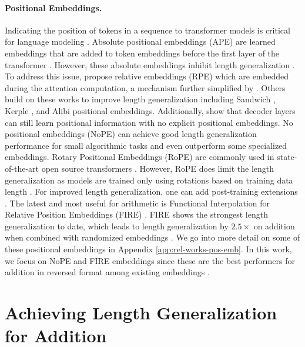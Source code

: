 \documentclass{article}
\begin{document}
\paragraph{Positional Embeddings.}
Indicating the position of tokens in a sequence to transformer models is critical for language modeling \citep{vaswani2017attention}.
Absolute positional embeddings (APE) are learned embeddings that are added to token embeddings before the first layer of the transformer \citep{vaswani2017attention}. 
However, these absolute embeddings inhibit length generalization \citep{press2022train}.
To address this issue, \citet{shaw2018self} propose relative embeddings (RPE) which are embedded during the attention computation, a mechanism further simplified by \citet{raffel2020exploring}.
Others build on these works to improve length generalization including Sandwich \citep{chi2023dissecting}, Kerple \citep{chi2022kerple}, and Alibi \citep{press2022train} positional embeddings.
Additionally, \citet{kazemnejad2023impact} show that decoder layers can still learn positional information with no explicit positional embeddings.
No positional embeddings (NoPE) can achieve good length generalization performance for small algorithmic tasks and even outperform some specialized embeddings.
Rotary Positional Embeddings (RoPE) \citep{su2024roformer} are commonly used in state-of-the-art open source transformers \citep[e.g.][]{touvron2023llama}.
However, RoPE does limit the length generalization as models are trained only using rotations based on training data length \citep{kazemnejad2023impact,press2022train}. 
For improved length generalization, one can add post-training extensions \citep{peng2024yarn}.
The latest and most useful for arithmetic is Functional Interpolation for Relative Position Embeddings (FIRE) \citep{li2023functional}.
FIRE shows the strongest length generalization to date, which leads to length generalization by $2.5 \times $ on addition \citep{zhou2024transformers} when combined with randomized embeddings \citep{ruoss2023randomized}.
We go into more detail on some of these positional embeddings in Appendix \ref{app:rel-works-pos-emb}.
In this work, we focus on NoPE and FIRE embeddings since these are the best performers for addition in reversed format among existing embeddings \citep{zhou2024transformers}.

\section{Achieving Length Generalization for Addition}
\label{sec:method}
\end{document}
